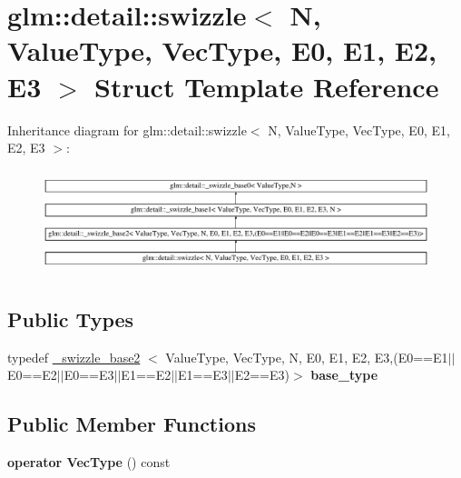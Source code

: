 \hypertarget{structglm_1_1detail_1_1swizzle}{\section{glm\-:\-:detail\-:\-:swizzle$<$ \-N, \-Value\-Type, \-Vec\-Type, \-E0, \-E1, \-E2, \-E3 $>$ \-Struct \-Template \-Reference}
\label{structglm_1_1detail_1_1swizzle}
}
\-Inheritance diagram for glm\-:\-:detail\-:\-:swizzle$<$ \-N, \-Value\-Type, \-Vec\-Type, \-E0, \-E1, \-E2, \-E3 $>$\-:\begin{figure}[H]
\begin{center}
\leavevmode
\includegraphics[height=3.072702cm]{structglm_1_1detail_1_1swizzle}
\end{center}
\end{figure}
\subsection*{\-Public \-Types}
\begin{DoxyCompactItemize}
\item 
\hypertarget{structglm_1_1detail_1_1swizzle_a6f5b33550379282023990c48c29162f6}{typedef \hyperlink{structglm_1_1detail_1_1__swizzle__base2}{\-\_\-swizzle\-\_\-base2}\*
$<$ \-Value\-Type, \-Vec\-Type, \-N, \-E0, \*
\-E1, \-E2, \-E3,(\-E0==\-E1$|$$|$\-E0==\-E2$|$$|$\-E0==\-E3$|$$|$\-E1==\-E2$|$$|$\-E1==\-E3$|$$|$\-E2==\-E3)$>$ {\bfseries base\-\_\-type}}\label{structglm_1_1detail_1_1swizzle_a6f5b33550379282023990c48c29162f6}

\end{DoxyCompactItemize}
\subsection*{\-Public \-Member \-Functions}
\begin{DoxyCompactItemize}
\item 
\hypertarget{structglm_1_1detail_1_1swizzle_ac290a0b7725247c5971c8fb91f28992b}{{\bfseries operator Vec\-Type} () const }\label{structglm_1_1detail_1_1swizzle_ac290a0b7725247c5971c8fb91f28992b}

\end{DoxyCompactItemize}
